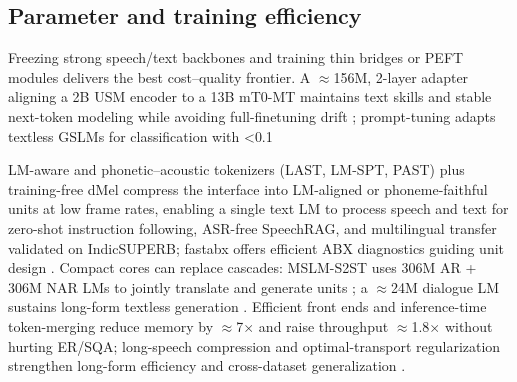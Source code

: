 \documentclass{article}
\begin{document}
\subsection{Parameter and training efficiency} \label{subsec:parameterandtrainingefficiency}
Freezing strong speech/text backbones and training thin bridges or PEFT modules delivers the best cost--quality frontier. A $\approx$156M, 2-layer adapter aligning a 2B USM encoder to a 13B mT0-MT maintains text skills and stable next-token modeling while avoiding full-finetuning drift \cite{wang2023slmbridgethingapbetweenspeechtextfoundat}; prompt-tuning adapts textless GSLMs for classification with <0.1%

LM-aware and phonetic--acoustic tokenizers (LAST, LM-SPT, PAST) plus training-free dMel compress the interface into LM-aligned or phoneme-faithful units at low frame rates, enabling a single text LM to process speech and text for zero-shot instruction following, ASR-free SpeechRAG, and multilingual transfer validated on IndicSUPERB; fastabx offers efficient ABX diagnostics guiding unit design \cite{turetzky2024lastlanguagemodelawarespeechtokenization,jo2025lmsptalignedsemanticdistillationspeechto,har-tuv2025pastphoneticacousticspeechtokenizer,bai2025dmelspeechtokenizationmadesimple,min2025speechretrievalaugmentedgenerationwithou,poli2025fastabxlibraryefficientcomputationabxdis,entry2025indicsuperbspeechprocessinguniversalperf,vashishth2024stabspeechtokenizerassessmentbenchmark}. Compact cores can replace cascades: MSLM-S2ST uses 306M AR + 306M NAR LMs to jointly translate and generate units \cite{peng2024mslms2stmultitaskspeechlanguagemodeltext}; a $\approx$24M dialogue LM sustains long-form textless generation \cite{nakata2024jchatjapaneselargescalespokendialoguecor}. Efficient front ends and inference-time token-merging reduce memory by $\approx$7$\times$ and raise throughput $\approx$1.8$\times$ without hurting ER/SQA; long-speech compression and optimal-transport regularization strengthen long-form efficiency and cross-dataset generalization \cite{lu2024fastadaspmultitaskadaptedefficientinfere,guo2025fastlongspeechenhancinglargespeechlangua,xu2025optimaltransportregularizationspeechtext}.
\end{document}
